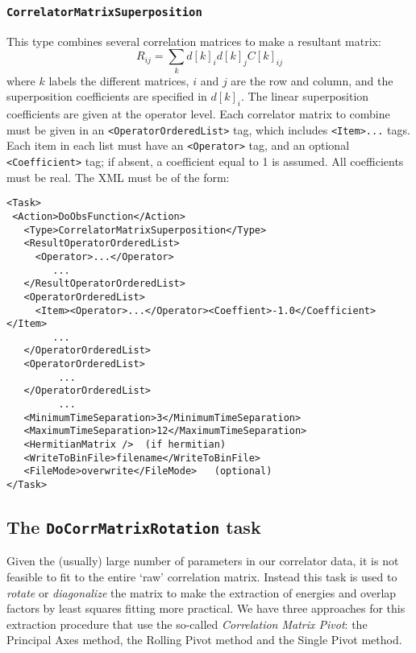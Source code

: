 \documentclass[12pt]{article}
\newcommand{\vb}{\texttt}
\begin{document}
\subsubsection{\vb{CorrelatorMatrixSuperposition}}
This type combines several correlation
matrices to make a resultant matrix:
\[
R_{i j} = \sum_k  d[k]_i d[k]_j  C[k]_{i j}
\]
where $k$ labels the different matrices, $i$ and $j$ are the row and column,
and the superposition coefficients are specified in $d[k]_i$.
The linear superposition coefficients are given at the operator
level.  Each correlator matrix to combine must be given in an
\vb{<OperatorOrderedList>} tag, which includes \vb{<Item>...} tags.  Each
item in each list must have an \vb{<Operator>} tag, and an optional
\vb{<Coefficient>} tag; if absent, a coefficient equal to 1 is assumed.
All coefficients must be real.
The XML must be of the form:
\begin{verbatim}
<Task>
 <Action>DoObsFunction</Action>
   <Type>CorrelatorMatrixSuperposition</Type>
   <ResultOperatorOrderedList>
     <Operator>...</Operator>
        ...
   </ResultOperatorOrderedList>
   <OperatorOrderedList>
     <Item><Operator>...</Operator><Coeffient>-1.0</Coefficient></Item>
        ...
   </OperatorOrderedList>
   <OperatorOrderedList>
         ...
   </OperatorOrderedList>
         ...
   <MinimumTimeSeparation>3</MinimumTimeSeparation>
   <MaximumTimeSeparation>12</MaximumTimeSeparation>
   <HermitianMatrix />  (if hermitian)
   <WriteToBinFile>filename</WriteToBinFile>
   <FileMode>overwrite</FileMode>   (optional)
</Task>
\end{verbatim}


\subsection{The \vb{DoCorrMatrixRotation} task} \label{sec:rotation}
Given the (usually) large number of parameters in our correlator data,
it is not feasible to fit to the entire `raw' correlation matrix. Instead
this task is used to \textit{rotate} or \textit{diagonalize} the matrix to
make the extraction of energies and overlap factors by least squares fitting
more practical. We have three approaches for this extraction procedure that use
the so-called \textit{Correlation Matrix Pivot}: the Principal Axes method, the
Rolling Pivot method and the Single Pivot method.\\
\end{document}
